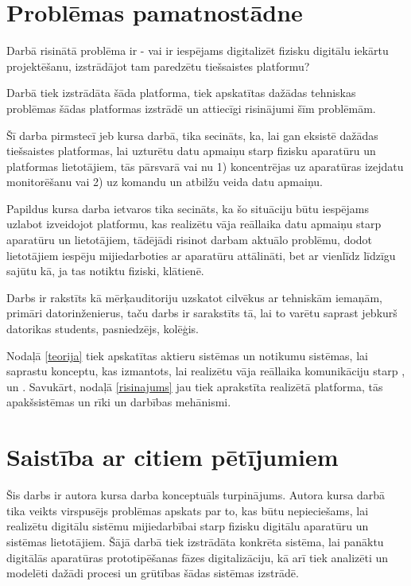\section{Problēmas pamatnostādne}

Darbā risinātā problēma ir - vai ir iespējams digitalizēt fizisku digitālu
iekārtu projektēšanu, izstrādājot tam paredzētu tiešsaistes platformu?

Darbā tiek izstrādāta šāda platforma, tiek apskatītas dažādas tehniskas
problēmas šādas platformas izstrādē un attiecīgi risinājumi šīm problēmām. 

Šī darba pirmstecī jeb kursa darbā, tika secināts, ka, lai gan eksistē dažādas
tiešsaistes platformas, lai uzturētu datu apmaiņu starp fizisku aparatūru un
platformas lietotājiem, tās pārsvarā vai nu 1) koncentrējas uz aparatūras
izejdatu monitorēšanu vai 2) uz komandu un atbilžu veida datu apmaiņu.
\cite[para. 3]{VeinbahsKrisjanis2021}

Papildus kursa darba ietvaros tika secināts, ka šo situāciju būtu iespējams
uzlabot izveidojot platformu, kas realizētu vāja reāllaika datu apmaiņu starp
aparatūru un lietotājiem, tādējādi risinot darbam aktuālo problēmu, dodot
lietotājiem iespēju mijiedarboties ar aparatūru attālināti, bet ar vienlīdz
līdzīgu sajūtu kā, ja tas notiktu fiziski, klātienē. \cite[para.
5]{VeinbahsKrisjanis2021} 

Darbs ir rakstīts kā mērķauditoriju uzskatot cilvēkus ar tehniskām iemaņām,
primāri datorinženierus, taču darbs ir sarakstīts tā, lai to varētu saprast
jebkurš datorikas students, pasniedzējs, kolēģis.

Nodaļā \ref{teorija} tiek apskatītas aktieru sistēmas un notikumu sistēmas, lai
saprastu konceptu, kas izmantots, lai realizētu vāja reāllaika komunikāciju
starp ,  un
. Savukārt, nodaļā \ref{risinajums} jau tiek
aprakstīta realizētā platforma, tās apakšsistēmas un rīki un darbības mehānismi.

\section{Saistība ar citiem pētījumiem}

Šis darbs ir autora kursa darba konceptuāls turpinājums. Autora kursa darbā tika veikts virspusējs problēmas
apskats par to, kas būtu nepieciešams, lai realizētu digitālu sistēmu mijiedarbībai starp fizisku digitālu 
aparatūru un sistēmas lietotājiem. Šājā darbā tiek izstrādāta konkrēta sistēma, lai panāktu digitālās aparatūras 
prototipēšanas fāzes digitalizāciju, kā arī tiek analizēti un modelēti dažādi procesi un grūtības šādas sistēmas
izstrādē. \cite{VeinbahsKrisjanis2021}

